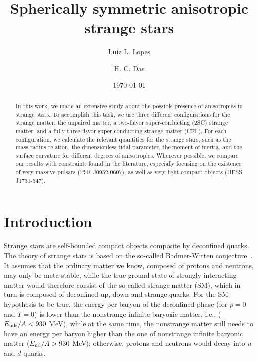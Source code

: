 \documentclass[%
reprint,
superscriptaddress,
nofootinbib,
amsmath,
amssymb,
aps,
floatfix,
showkeys,
]{revtex4-2}
\begin{document}
\title{Spherically symmetric anisotropic strange stars}
\author{Luiz L. Lopes}

\author{H. C. Das}
\date{\today}
\begin{abstract}
In this work, we made an extensive study about the possible presence of anisotropies in strange stars. To accomplish this task, we use three different configurations for the strange matter: the unpaired matter, a two-flavor super-conducting (2SC) strange matter, and a fully three-flavor super-conducting strange matter (CFL). For each configuration, we calculate the relevant quantities for the strange stars, such as the mass-radius relation, the dimensionless tidal parameter, the moment of inertia, and the surface curvature for different degrees of anisotropies. Whenever possible, we compare our results with constraints found in the literature, especially focusing on the existence of very massive pulsars (PSR J0952-0607), as well as very light compact objects (HESS J1731-347).
\end{abstract}
\maketitle
\section{Introduction}
Strange stars are self-bounded compact objects composite by deconfined quarks. The theory of strange stars is based on the so-called Bodmer-Witten conjecture~\cite{Bodmer_1971, Witten_1984}. It assumes that the ordinary matter we know, composed of protons and neutrons, may only be meta-stable, while the true ground state of strongly interacting matter would therefore consist of the so-called strange matter (SM), which in turn is composed of deconfined up, down and strange quarks. For the SM hypothesis to be true, the energy per baryon of the deconfined phase (for $p = 0$ and $T = 0$) is lower than the nonstrange infinite baryonic matter, i.e., ($E_{\rm uds}/A < 930$ MeV), while at the same time, the nonstrange matter still needs to have an energy per baryon higher than the one of nonstrange infinite baryonic matter ($E_{\rm ud}/A > 930$ MeV); otherwise, protons and neutrons would decay into $u$ and $d$ quarks.
\end{document}
